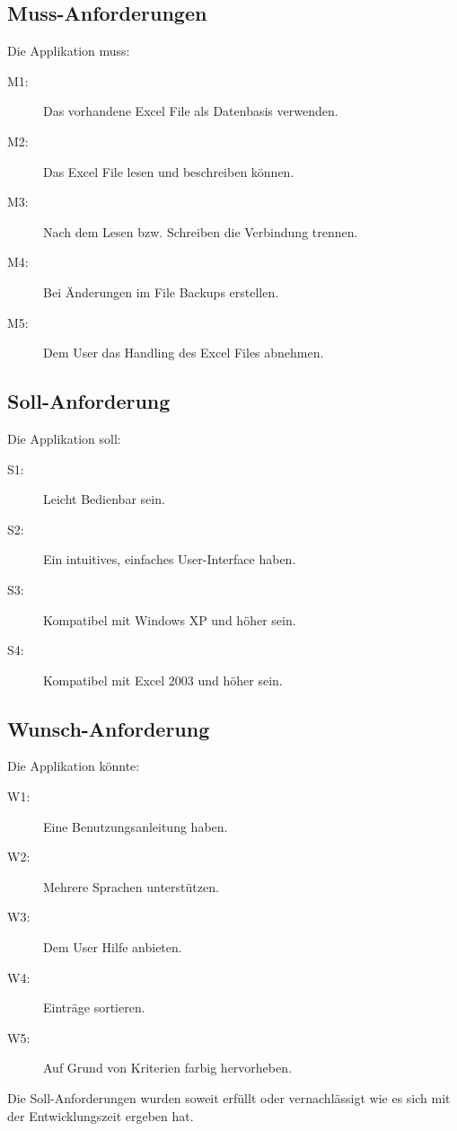 \documentclass{article}
\begin{document}
\subsection{Muss-Anforderungen}
Die Applikation muss:
	\begin{description}
		\item[M1:] Das vorhandene Excel File als Datenbasis verwenden.
		\item[M2:] Das Excel File lesen und beschreiben können.
		\item[M3:] Nach dem Lesen bzw. Schreiben die Verbindung trennen.
		\item[M4:] Bei Änderungen im File Backups erstellen.
		\item[M5:] Dem User das Handling des Excel Files abnehmen.
	\end{description}

\subsection{Soll-Anforderung}
Die Applikation soll:
\begin{description}
	\item[S1:] Leicht Bedienbar sein.
	\item[S2:] Ein intuitives, einfaches User-Interface haben.
	\item[S3:] Kompatibel mit Windows XP und höher sein.
	\item[S4:] Kompatibel mit Excel 2003 und höher sein.
\end{description}

\subsection{Wunsch-Anforderung}
Die Applikation könnte:
\begin{description}
	\item[W1:] Eine Benutzungsanleitung haben.
	\item[W2:] Mehrere Sprachen unterstützen.
	\item[W3:] Dem User Hilfe anbieten.
	\item[W4:] Einträge sortieren.
	\item[W5:] Auf Grund von Kriterien farbig hervorheben.
	\\
\end{description}

Die Soll-Anforderungen wurden soweit erfüllt oder vernachlässigt wie es sich mit der Entwicklungszeit ergeben hat. 
\end{document}
